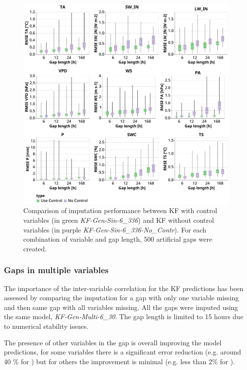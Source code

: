 \documentclass{article}
\newcommand{\imgwidth}{6in}
\begin{document}
\begin{figure}
\centerline{\includegraphics[width=\imgwidth]{use_control}}
\caption{Comparison of imputation performance between KF with control variables (in green \textit{KF-Gen-Sin-6\_336}) and KF without control variables (in purple \textit{KF-Gen-Sin-6\_336-No\_Contr}). For each combination of variable and gap length, 500 artificial gaps were created.}
\label{fig:control}
\end{figure}

\subsubsection{Gaps in multiple variables}

The importance of the inter-variable correlation for the KF predictions has been assessed by comparing the imputation for a gap with only one variable missing and then same gap with all variables missing. All the gaps were imputed using the same model, \textit{KF-Gen-Multi-6\_30}. The gap length is limited to 15 hours due to numerical stability issues.

The presence of other variables in the gap is overall improving the model predictions, for some variables there is a significant error reduction (e.g. around 40 \% for ) but for others the improvement is minimal (e.g. less than 2\% for ).
\end{document}
